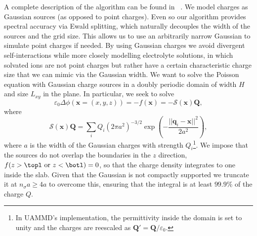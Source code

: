 \documentclass[ twoside,openright,titlepage,numbers=noenddot,%
headinclude,footinclude,cleardoublepage=empty,abstract=on,
BCOR=5mm,paper=b5,fontsize=11pt, dvipsnames
]{scrreprt}
\renewcommand{\vec}[1]{\bm{#1}}
\newcommand{\oper}[1]{\mathcal{#1}}
\newcommand{\uammd}{\gls{UAMMD}\xspace}
\newcommand{\ppos}{q}
\begin{document}
%
A complete description of the algorithm can be found in ~\cite{Maxian2021}.
We model charges as Gaussian sources (as opposed to point charges). Even so our algorithm provides spectral accuracy via Ewald splitting, which naturally decouples the width of the sources and the grid size. This allows us to use an arbitrarily narrow Gaussian to simulate point charges if needed. By using Gaussian charges we avoid divergent self-interactions while more closely modelling electrolyte solutions, in which solvated ions are not point charges but rather have a certain characteristic charge size that we can mimic via the Gaussian width.
We want to solve the Poisson equation with Gaussian charge sources in a doubly periodic domain of width $H$ and size $L_{xy}$ in the plane. In particular, we seek to solve
\begin{equation}\label{eq:dppoisson}
 \varepsilon_0\Delta\phi(\vec{x} = (x,y,z))=-f(\vec{x})=-\oper{S}(\vec{x})\vec{Q},
\end{equation}
where 
\begin{equation}\label{eq:dppoissongauss}
 \oper{S}(\vec{x})\vec{Q} = \sum_iQ_i\left(2\pi a^2\right)^{-3/2}\exp\left(-\frac{||\vec{\ppos}_i-\vec{x}||^2}{2a^2}\right),
\end{equation}
where $a$ is the width of the Gaussian charges with strength $Q_i$\footnote{In \uammd's implementation, the permittivity inside the domain is set to unity and the charges are reescaled as $\vec{Q}' = \vec{Q}/\varepsilon_0$.}.
We impose that the sources do not overlap the boundaries in the $z$ direction, $f(z>\topl \text{ or } z<\botl) = 0$, so that the charge density integrates to one inside the slab. Given that the Gaussian is not compactly supported we truncate it at $n_\sigma a \ge 4 a$ to overcome this, ensuring that the integral is at least $99.9\%$ of the charge $Q$.
\end{document}
